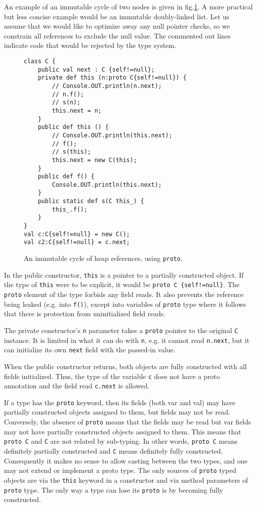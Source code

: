 An example of an immutable cycle of two nodes is given in
fig.\ref{Figure:Cyclic}.  A more practical but less concise example would be an
immutable doubly-linked list.  Let us assume that we would like to optimize
away any null pointer checks, so we constrain all references to exclude the
null value.  The commented out lines indicate code that would be rejected by
the type system.  

\begin{figure}
\begin{lstlisting}
class C {
    public val next : C {self!=null};
    private def this (n:proto C{self!=null}) {
        // Console.OUT.println(n.next);
        // n.f();
        // s(n);
        this.next = n;
    }
    public def this () {
        // Console.OUT.println(this.next);
        // f();
        // s(this);
        this.next = new C(this);
    }
    public def f() {
        Console.OUT.println(this.next);
    }
    public static def s(C this_) {
        this_.f();
    }
}
val c:C{self!=null} = new C();
val c2:C{self!=null} = c.next;
\end{lstlisting}
\caption{An immutable cycle of heap references, using \texttt{proto}.}
\label{Figure:Cyclic}
\end{figure}

In the public constructor, \texttt{this} is a pointer to a partially
constructed object.  If the type of \texttt{this} were to be explicit, it would
be \texttt{proto C \{self!=null\}}.  The \texttt{proto} element of the type
forbids any field reads.  It also prevents the reference being leaked (e.g.
into \texttt{f()}), except into variables of \texttt{proto} type where it
follows that there is protection from uninitialized field reads.

The private constructor's \texttt{n} parameter takes a \texttt{proto} pointer
to the original \texttt{C} instance.  It is limited in what it can do with
\texttt{n}, e.g. it cannot read \texttt{n.next}, but it can initialize its own
\texttt{next} field with the passed-in value.

When the public constructor returns, both objects are fully constructed with
all fields initialized.  Thus, the type of the variable \texttt{c} does not
have a proto annotation and the field read \texttt{c.next} is allowed.

If a type has the \texttt{proto} keyword, then its fields (both var and val)
may have partially constructed objects assigned to them, but fields may not be
read.  Conversely, the absence of \texttt{proto} means that the fields may be
read but var fields may not have partially constructed objects assigned to them.
This means that \texttt{proto C} and \texttt{C} are not related by sub-typing.
In other words, \texttt{proto C} means definitely partially constructed and
\texttt{C} means definitely fully constructed.  Consequently it makes no sense
to allow casting between the two types, and one may not extend or implement a
proto type.  The only sources of \texttt{proto} typed objects are via the
\texttt{this} keyword in a constructor and via method parameters of
\texttt{proto} type.  The only way a type can lose its \texttt{proto} is by
becoming fully constructed.

